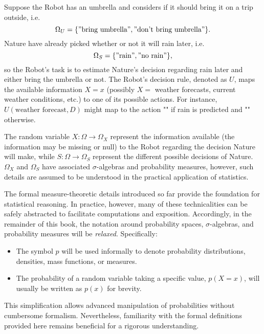 \newpage
\begin{example}
	\label{ex:rain}
	Suppose the Robot has an umbrella and considers if it should bring it on a trip outside, i.e.
	\begin{equation}
		\Omega_U = \{"\text{bring umbrella}", "\text{don't bring umbrella}"\}.
	\end{equation}
	Nature have already picked whether or not it will rain later, i.e.
	\begin{equation}
		\Omega_S = \{"\text{rain}", "\text{no rain}"\},
	\end{equation}
	so the Robot's task is to estimate Nature's decision regarding rain later and either bring the umbrella or not. The Robot's decision rule, denoted as $U$, maps the available information $X=x$ (possibly $X=$ weather forecasts, current weather conditions, etc.) to one of its possible actions. For instance, $U(\text{weather forecast}, D)$ might map to the action "" if rain is predicted and "" otherwise.
\end{example}

The random variable $X: \Omega \to \Omega_X$ represent the information available (the information may be missing or null) to the Robot regarding the decision Nature will make, while $S: \Omega \to \Omega_S$ represent the different possible decisions of Nature. $\Omega_X$ and $\Omega_S$ have associated $\sigma$-algebras and probability measures, however, such details are assumed to be understood in the practical application of statistics. 

\begin{remark}
	\label{sec:notation}
	The formal measure-theoretic details introduced so far provide the foundation for statistical reasoning. In practice, however, many of these technicalities can be safely abstracted to facilitate computations and exposition.
	Accordingly, in the remainder of this book, the notation around probability spaces, $\sigma$-algebras, and probability measures will be \emph{relaxed}. Specifically:
	\begin{itemize}
		\item The symbol $p$ will be used informally to denote probability distributions, densities, mass functions, or measures.
		\item The probability of a random variable taking a specific value, $p(X=x)$, will usually be written as $p(x)$ for brevity.
	\end{itemize}
	
	This simplification allows advanced manipulation of probabilities without cumbersome formalism. Nevertheless, familiarity with the formal definitions provided here remains beneficial for a rigorous understanding.
\end{remark}

